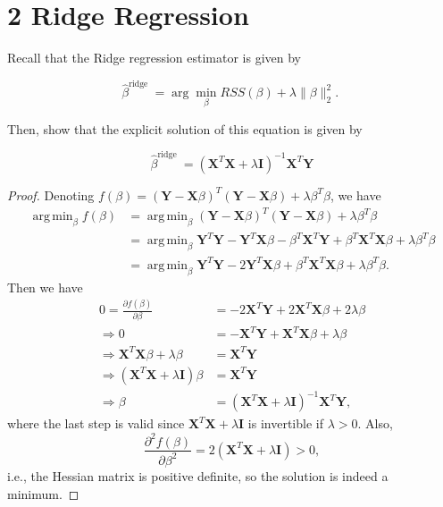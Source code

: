 \documentclass[10pt]{article}
\DeclareMathOperator*{\argmin}{arg\,min}
\begin{document}
\section*{2 Ridge Regression}
Recall that the Ridge regression estimator is given by

$$
\hat{\beta}^{\text {ridge }}=\arg \min _{\beta} R S S(\beta)+\lambda\|\beta\|_{2}^{2} \text {. }
$$

Then, show that the explicit solution of this equation is given by

$$
\hat{\beta}^{\text {ridge }}=\left(\mathbf{X}^{T} \mathbf{X}+\lambda \mathbf{I}\right)^{-1} \mathbf{X}^{T} \mathbf{Y}
$$
\begin{proof}
    Denoting $f(\beta) = (\mathbf{Y}-\mathbf{X}\beta)^{T}(\mathbf{Y}-\mathbf{X}\beta)+\lambda\beta^{T}\beta$, we have
\begin{align*}
    \argmin_{\beta} f(\beta) &= \argmin_{\beta} (\mathbf{Y}-\mathbf{X}\beta)^{T}(\mathbf{Y}-\mathbf{X}\beta)+\lambda\beta^{T}\beta\\
    &= \argmin_{\beta} \mathbf{Y}^{T}\mathbf{Y}-\mathbf{Y}^{T}\mathbf{X}\beta-\beta^{T}\mathbf{X}^{T}\mathbf{Y}+\beta^{T}\mathbf{X}^{T}\mathbf{X}\beta+\lambda\beta^{T}\beta\\
    &= \argmin_{\beta} \mathbf{Y}^{T}\mathbf{Y}-2\mathbf{Y}^{T}\mathbf{X}\beta+\beta^{T}\mathbf{X}^{T}\mathbf{X}\beta+\lambda\beta^{T}\beta.
\end{align*}
Then we have
\begin{align*}
    0=\frac{\partial f(\beta)}{\partial \beta} &= -2\mathbf{X}^{T}\mathbf{Y}+2\mathbf{X}^{T}\mathbf{X}\beta+2\lambda\beta\\
    \Rightarrow 0 &= -\mathbf{X}^{T}\mathbf{Y}+\mathbf{X}^{T}\mathbf{X}\beta+\lambda\beta\\
    \Rightarrow \mathbf{X}^{T}\mathbf{X}\beta+\lambda\beta &= \mathbf{X}^{T}\mathbf{Y}\\
    \Rightarrow (\mathbf{X}^{T}\mathbf{X}+\lambda\mathbf{I})\beta &= \mathbf{X}^{T}\mathbf{Y}\\
    \Rightarrow \beta &= (\mathbf{X}^{T}\mathbf{X}+\lambda\mathbf{I})^{-1}\mathbf{X}^{T}\mathbf{Y},
\end{align*}
where the last step is valid since $\mathbf{X}^{T}\mathbf{X}+\lambda\mathbf{I}$ is invertible if $\lambda > 0$. Also, \[\frac{\partial^2 f(\beta)}{\partial\beta^2}=2(\mathbf{X}^T\mathbf{X}+\lambda\mathbf{I})>0,\]
i.e., the Hessian matrix is positive definite, so the solution is indeed a minimum.
\end{proof}
\end{document}
